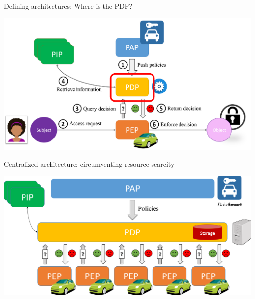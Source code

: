 \begin{frame}{Defining architectures: Where is the PDP?}
    \begin{center}
        \includegraphics[scale=0.33]{Figures/AC_instance_7.png}
    \end{center}
    
\end{frame}

\begin{frame}{Centralized architecture: circumventing resource scarcity}
    \begin{center}
        \includegraphics[scale=0.33]{Figures/central_archi.png}
    \end{center}
    
\end{frame}


